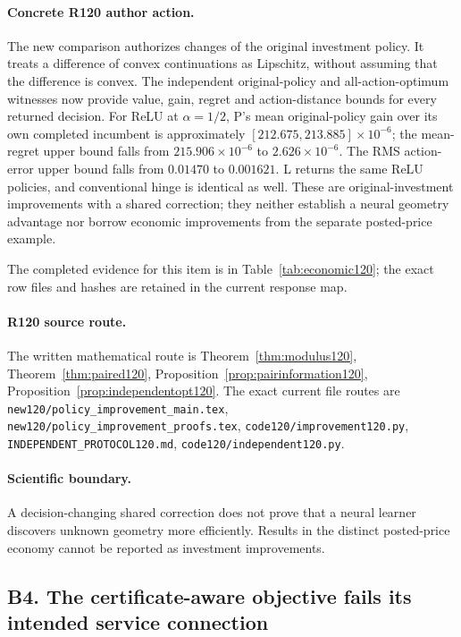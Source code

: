 \paragraph{Concrete R120 author action.}
The new comparison authorizes changes of the original investment policy. It treats a difference of convex continuations as Lipschitz, without assuming that the difference is convex. The independent original-policy and all-action-optimum witnesses now provide value, gain, regret and action-distance bounds for every returned decision. For ReLU at $\alpha=1/2$, P's mean original-policy gain over its own completed incumbent is approximately $[212.675,213.885]\times10^{-6}$; the mean-regret upper bound falls from $215.906\times10^{-6}$ to $2.626\times10^{-6}$. The RMS action-error upper bound falls from $0.01470$ to $0.001621$. L returns the same ReLU policies, and conventional hinge is identical as well. These are original-investment improvements with a shared correction; they neither establish a neural geometry advantage nor borrow economic improvements from the separate posted-price example.

The completed evidence for this item is in Table~\ref{tab:economic120}; the exact row files and hashes are retained in the current response map.
\paragraph{R120 source route.}
The written mathematical route is Theorem~\ref{thm:modulus120}, Theorem~\ref{thm:paired120}, Proposition~\ref{prop:pairinformation120}, Proposition~\ref{prop:independentopt120}. The exact current file routes are \nolinkurl{new120/policy_improvement_main.tex}, \nolinkurl{new120/policy_improvement_proofs.tex}, \nolinkurl{code120/improvement120.py}, \nolinkurl{INDEPENDENT_PROTOCOL120.md}, \nolinkurl{code120/independent120.py}.
\paragraph{Scientific boundary.}
A decision-changing shared correction does not prove that a neural learner discovers unknown geometry more efficiently. Results in the distinct posted-price economy cannot be reported as investment improvements.

\subsection{B4. The certificate-aware objective fails its intended service connection}
\label{response120:B4}
